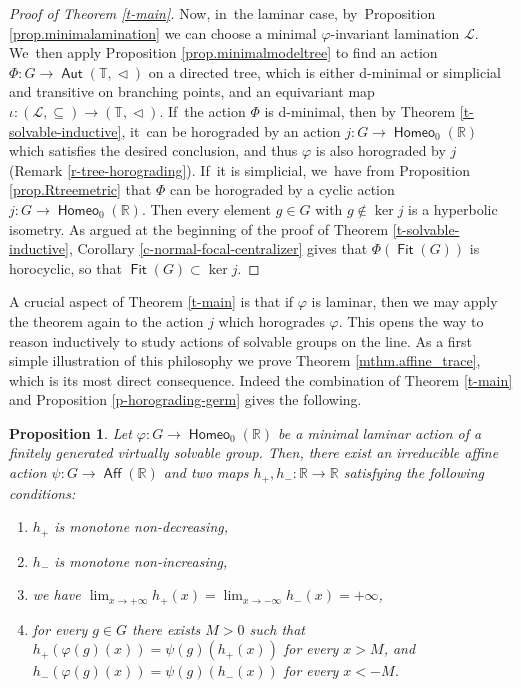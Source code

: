\documentclass[JEP,XML,SOM,Unicode,NoFloatCountersInSection,published]{cedram}
\newtheorem{prop}[thm]{Proposition}
\theoremstyle{definition}
\DeclareMathOperator{\Aff}{\mathsf{Aff}}
\DeclareMathOperator{\Aut}{\mathsf{Aut}}
\DeclareMathOperator{\Fit}{\mathsf{Fit}}
\DeclareMathOperator{\homeo}{\mathsf{Homeo}}
\newcommand{\R}{\mathbb{R}}
\newcommand{\Tbb}{\mathbb T}
\newcommand{\Lcal}{\mathcal{L}}
\newcommand{\treeorder}{\mathrel{\triangleleft}}
\begin{document}
\begin{proof}[Proof of Theorem \ref{t-main}]
Now, in~the laminar case, by~Proposition \ref{prop.minimalamination} we can choose a minimal $\varphi$-invariant lamination $\Lcal$. We~then apply Proposition \ref{prop.minimalmodeltree} to find an action $\Phi \colon G\to \Aut(\Tbb, \treeorder)$ on a directed tree, which is either d-minimal or simplicial and transitive on branching points, and an equivariant map $\iota\colon (\Lcal, \subseteq)\to (\Tbb, \treeorder)$. If~the action $\Phi $ is d-minimal, then by Theorem \ref{t-solvable-inductive}, it~can be horograded by an action $j\colon G\to \homeo_0(\R)$ which satisfies the desired conclusion, and thus $\varphi$ is also horograded by $j$ (Remark \ref{r-tree-horograding}). If~it is simplicial, we~have from Proposition \ref{prop.Rtreemetric} that $\Phi$ can be horograded by a cyclic action $j\colon G\to \homeo_0(\R)$. Then every element $g\in G$ with $g\notin \ker j$ is a hyperbolic isometry. As argued at the beginning of the proof of Theorem \ref{t-solvable-inductive}, Corollary \ref{c-normal-focal-centralizer} gives that $\Phi(\Fit(G))$ is horocyclic, so that $\Fit(G)\subset \ker j$.
\end{proof}

A crucial aspect of Theorem \ref{t-main} is that if $\varphi$ is laminar, then we may apply the theorem again to the action $j$ which horogrades $\varphi$. This opens the way to reason inductively to study actions of solvable groups on the line.
As a first simple illustration of this philosophy we prove Theorem \ref{mthm.affine_trace}, which is its most direct consequence. Indeed the combination of Theorem \ref{t-main} and Proposition \ref{p-horograding-germ} gives the following.

\begin{prop}\label{p-germs-solvable}
Let $\varphi \colon G \to \homeo_0(\R)$ be a minimal laminar action of a finitely generated virtually solvable group. Then, there exist an irreducible affine action $\psi\colon G\to \Aff(\R)$ and two maps $h_+, h_-\colon \R\to \R$
satisfying the following conditions:
\begin{enumerate}
\item $h_+$ is monotone non-decreasing,
\item $h_-$ is monotone non-increasing,
\item we have $\lim_{x\to +\infty}h_+(x)=\lim_{x\to -\infty} h_-(x)=+\infty$,
\item for every $g
\in G$ there exists $M>0$ such that $ h_+(\varphi(g)(x))=\psi(g) (h_+(x))$ for every $x>M$, and $ h_-(\varphi(g)(x))=\psi(g)(h_-(x))$ for every $x<-M$.
\end{enumerate}
\end{prop}
\end{document}
